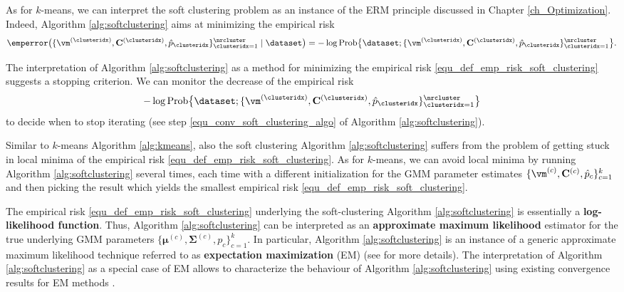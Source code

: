 \documentclass[12pt]{report}
\begin{document}
As for $k$-means, we can interpret the soft clustering problem 
as an instance of the ERM principle discussed in Chapter \ref{ch_Optimization}. 
Indeed, Algorithm \ref{alg:softclustering} aims at minimizing the 
empirical risk 
\begin{equation} 
\label{equ_def_emp_risk_soft_clustering}
\emperror \big( \{ \vm^{(\clusteridx)}, \mathbf{C}^{(\clusteridx)}, \hat{p}_{\clusteridx} \}_{\clusteridx=1}^{\nrcluster} \mid \dataset \big)=
 - \log {\rm Prob} \big\{\dataset; \{ \vm^{(\clusteridx)}, \mathbf{C}^{(\clusteridx)}, \hat{p}_{\clusteridx} \}_{\clusteridx=1}^{\nrcluster}\big\}. 
\end{equation} 

The interpretation of Algorithm \ref{alg:softclustering} as a 
method for minimizing the empirical risk \eqref{equ_def_emp_risk_soft_clustering} 
suggests a stopping criterion. We can monitor the decrease of the empirical risk 
$$ - \log {\rm Prob} \big\{\dataset; \{ \vm^{(\clusteridx)}, \mathbf{C}^{(\clusteridx)}, \hat{p}_{\clusteridx} \}_{\clusteridx=1}^{\nrcluster}\big\}$$
to decide when to stop iterating (see step \ref{equ_conv_soft_clustering_algo} 
of Algorithm \ref{alg:softclustering}). %

Similar to $k$-means Algorithm \ref{alg:kmeans}, also the soft clustering 
Algorithm \ref{alg:softclustering} suffers from the problem of getting stuck 
in local minima of the empirical risk \eqref{equ_def_emp_risk_soft_clustering}. 
As for $k$-means, we can avoid local minima by running Algorithm \ref{alg:softclustering} 
several times, each time with a different initialization for the GMM parameter 
estimates $ \{ \vm^{(c)}, \mathbf{C}^{(c)}, \hat{p}_{c} \}_{c=1}^{k}$ and then 
picking the result which yields the smallest empirical risk \eqref{equ_def_emp_risk_soft_clustering}.  

The empirical risk \eqref{equ_def_emp_risk_soft_clustering} underlying the 
soft-clustering Algorithm \ref{alg:softclustering} is essentially a {\bf log-likelihood function}. 
Thus, Algorithm \ref{alg:softclustering} can be interpreted as an {\bf approximate maximum 
likelihood} estimator for the true underlying GMM parameters $\{{\bm \mu}^{(c)},{\bm \Sigma}^{(c)},p_{c}\}_{c=1}^{k}$. 
In particular, Algorithm \ref{alg:softclustering} is an instance of a generic 
approximate maximum likelihood technique referred to as {\bf expectation maximization} 
(EM) (see \cite[Chap. 8.5]{hastie01statisticallearning} for more details). 
The interpretation of Algorithm \ref{alg:softclustering} as a special case of 
EM allows to characterize the behaviour of Algorithm \ref{alg:softclustering} 
using existing convergence results for EM methods \cite{XuJordan1996}. 
%
\end{document}
